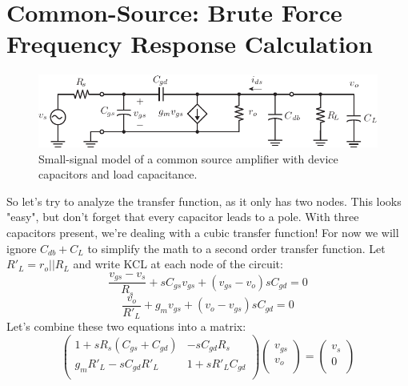 \section{Common-Source:  Brute Force Frequency Response Calculation}
\begin{figure}[tb]
\centering
\includegraphics[scale=1]{cs_amp_ac_caps}
\caption{Small-signal model of a common source amplifier with device capacitors and load capacitance.} \label{fig:cs_amp_ac_caps}
\end{figure}
So let's try to analyze the transfer function, as it only has two nodes.  This looks "easy", but don't forget that every capacitor leads to a pole.  With three capacitors present, we're dealing with a cubic transfer function! For now we will ignore $C_{db}+C_L$ to simplify the math to a second order transfer function.  
Let $R'_L = r_o || R_L$ and write KCL at each node of the circuit:
    \begin{equation}
        \frac{v_{gs} - v_s}{R_s} + s C_{gs} v_{gs} + (v_{gs} - v_o) s C_{gd} = 0
    \end{equation}
    \begin{equation}
        \frac{v_o}{R'_L} + g_m v_{gs} + (v_o - v_{gs}) s C_{gd} = 0 
    \end{equation}
Let's combine these two equations into a matrix:
    \begin{equation}
        \begin{pmatrix}
        1 + s R_s (C_{gs} + C_{gd}) & -s C_{gd} R_s \\
        g_m R'_L - s C_{gd} R'_L & 1 + s R'_L C_{gd}\\
        \end{pmatrix}
        \begin{pmatrix}
        v_{gs} \\ v_o\\
        \end{pmatrix} 	
        =
        \begin{pmatrix}
        v_s \\ 0\\
        \end{pmatrix} 
    \end{equation}
